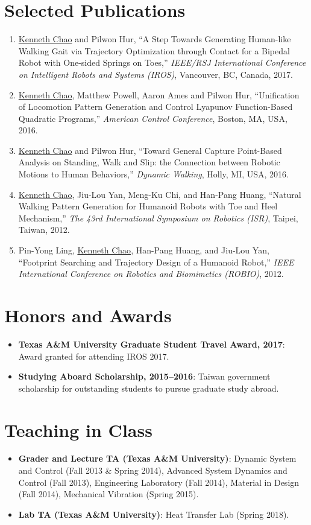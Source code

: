 \documentclass[letterpaper,11pt]{article}
\newcommand{\resumeItem}[2]{
  \item\small{
    \textbf{#1}{: #2 \vspace{-2pt}}
  }
}
\newcommand{\resumeNumItem}[1]{
  \item\small{
    {#1 \vspace{-2pt}}
  }
}
\newcommand{\resumeSubItem}[2]{\resumeItem{#1}{#2}\vspace{-4pt}}
\newcommand{\resumeSubHeadingListStart}{\begin{itemize}[leftmargin=*]}
\newcommand{\resumeSubHeadingListEnd}{\end{itemize}}
\newcommand{\resumeNumItemListStart}{\begin{enumerate}}
\newcommand{\resumeNumItemListEnd}{\end{enumerate}\vspace{-5pt}}
\begin{document}
\section{Selected Publications}
  \resumeNumItemListStart
\resumeNumItem
{\underline{Kenneth Chao} and Pilwon Hur, ``A Step Towards Generating Human-like Walking Gait via Trajectory Optimization through Contact for a Bipedal Robot with One-sided Springs on Toes,''  \textit{IEEE/RSJ International Conference on Intelligent Robots and Systems (IROS)}, Vancouver, BC, Canada, 2017.}  
  
\resumeNumItem
{\underline{Kenneth Chao}, Matthew Powell, Aaron Ames and Pilwon Hur, ``Unification of Locomotion Pattern Generation and Control Lyapunov Function-Based Quadratic Programs,''
             	\textit{American Control Conference},
             	Boston, MA, USA, 2016.}
\resumeNumItem
{\underline{Kenneth Chao} and Pilwon Hur,
	``Toward General Capture Point-Based Analysis on Standing, Walk and Slip: the Connection between Robotic Motions to Human Behaviors,''
	\textit{Dynamic Walking},
	Holly, MI, USA, 2016.}    
\resumeNumItem
{\underline{Kenneth Chao}, Jiu-Lou Yan, Meng-Ku Chi, and Han-Pang Huang,
	``Natural Walking Pattern Generation for Humanoid Robots with Toe and Heel Mechanism,''
	\textit{The 43rd International Symposium on Robotics (ISR)},
	Taipei, Taiwan,
2012.}
\resumeNumItem
{Pin-Yong Ling, \underline{Kenneth Chao}, Han-Pang Huang, and Jiu-Lou Yan,
	``Footprint Searching and Trajectory Design of a Humanoid Robot,''
	\textit{IEEE International Conference on Robotics and Biomimetics (ROBIO)},
2012.}
    	
  \resumeNumItemListEnd


\section{Honors and Awards}
  \resumeSubHeadingListStart
        \resumeSubItem{Texas A\&M University Graduate Student Travel Award, 2017}
        {Award granted for attending IROS 2017.}     
      \resumeSubItem{Studying Aboard Scholarship, 2015--2016}
      {Taiwan government scholarship for outstanding students to pursue graduate study abroad.}
  \resumeSubHeadingListEnd
\section{Teaching in Class}
  \resumeSubHeadingListStart
      \resumeSubItem{Grader and Lecture TA (Texas A\&M University)}
      {Dynamic System and Control (Fall 2013 \& Spring 2014), Advanced System Dynamics and Control (Fall 2013), Engineering Laboratory (Fall 2014), Material in Design (Fall 2014), Mechanical Vibration (Spring 2015).}
      \resumeSubItem{Lab TA (Texas A\&M University)}
      {Heat Transfer Lab (Spring 2018).}      
  \resumeSubHeadingListEnd
\end{document}

